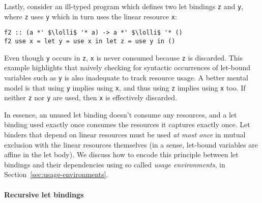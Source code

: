 \documentclass[acmsmall,review,screen]{acmart}
\newcommand{\incode}[1]{\lstinline{#1}}
\newcommand{\parawith}[1]{\paragraph{\emph{#1}}}
\newcommand{\lolli}{\multimap}
\newcommand{\ROUNDTWO}[1]{{\color{red}#1}}
\begin{document}
Lastly, consider an ill-typed program which defines two let bindings \incode{z}
and \incode{y}, where \incode{z} uses \incode{y} which in turn uses the linear
resource \incode{x}:
%
\begin{noway}
\begin{lstlisting}
f2 :: (a *' $\lolli$ '* a) -> a *' $\lolli$ '* ()
f2 use x = let y = use x in let z = use y in ()
\end{lstlisting}
\end{noway}
%
Even though \incode{y} occurs in \incode{z}, \incode{x} is never consumed
\ROUNDTWO{because \incode{z} is discarded}. \ROUNDTWO{This example highlights
that naively checking for syntactic occurrences of let-bound variables such as
\incode{y} is also inadequate to track resource usage}.
%
\ROUNDTWO{A better mental model is that} using \incode{y} implies
using \incode{x}, and thus using \incode{z} implies using \incode{x}
\ROUNDTWO{too}. If neither \incode{z} nor \incode{y} are used, then \incode{x}
is \ROUNDTWO{effectively discarded}.

In essence, an unused let binding doesn't consume any resources, and a let
binding used exactly once consumes the resources it captures exactly once. Let
binders that depend on linear resources must be used \emph{at most once} in
mutual exclusion with the linear resources themselves (in a sense,
let-bound variables are affine in the let body).
%
%
We discuss how to encode this principle between let bindings and their dependencies using so called \emph{usage
environments}, in Section~\ref{sec:usage-environments}.

\paragraph{Recursive let bindings\label{sec:semantic-linearity-examples:recursive-lets}}

%
\end{document}
